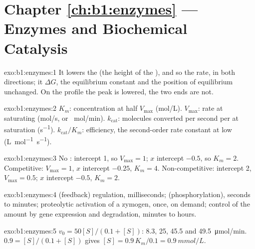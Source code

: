 \section*{Chapter \ref{ch:b1:enzymes} --- Enzymes and Biochemical Catalysis}

\begin{solution}{exo:b1:enzymes:1}
It lowers the  (the height of the ),
and so the rate, in both directions; it  $\Delta G$, the
equilibrium constant and the position of equilibrium unchanged. On the
profile the peak is lowered, the two ends are not.
\end{solution}

\begin{solution}{exo:b1:enzymes:2}
$K_m$:  concentration at half $V_{\max}$ (\unit{mol/L}).
$V_{\max}$: rate at saturating  (\unit{mol/s}, or \unit{\micro
mol/min}). $k_{\text{cat}}$:  molecules converted per second per
 at saturation (\unit{s^{-1}}). $k_{\text{cat}}/K_m$: efficiency,
the second-order rate constant at low 
(\unit{L.mol^{-1}.s^{-1}}).
\end{solution}

\begin{solution}{exo:b1:enzymes:3}
No : intercept 1, so $V_{\max} = 1$; $x$ intercept $-0.5$, so
$K_m = 2$. Competitive: $V_{\max} = 1$, $x$ intercept $-0.25$, $K_m = 4$.
Non-competitive: intercept 2, $V_{\max} = 0.5$; $x$ intercept $-0.5$,
$K_m = 2$.
\end{solution}

\begin{solution}{exo:b1:enzymes:4}
 (feedback) regulation, milliseconds; 
(phosphorylation), seconds to minutes; proteolytic activation of a
zymogen, once, on demand; control of the amount by gene expression and
degradation, minutes to hours.
\end{solution}

\begin{solution}{exo:b1:enzymes:5}
$v_0 = 50[S]/(0.1 + [S])$: 8.3, 25, 45.5 and \qty{49.5}{\micro mol/min}.
$0.9 = [S]/(0.1 + [S])$ gives $[S] = 0.9\,K_m/0.1 = \qty{0.9}{mmol/L}$.
\end{solution}


